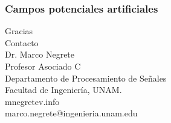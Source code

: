 \documentclass[10pt,spanish,aspectratio=1610]{beamer}
\begin{document}
\begin{frame}\frametitle{Campos potenciales artificiales}
  
\end{frame}



\begin{frame}
  \Huge{Gracias}
  \[\]
  \Large{Contacto}
  \[\]
  \large
  Dr. Marco Negrete\\
  Profesor Asociado C\\
  Departamento de Procesamiento de Señales\\
  Facultad de Ingeniería, UNAM.
\[\]
mnegretev.info\\
marco.negrete@ingenieria.unam.edu\\
\end{frame}
\end{document}
